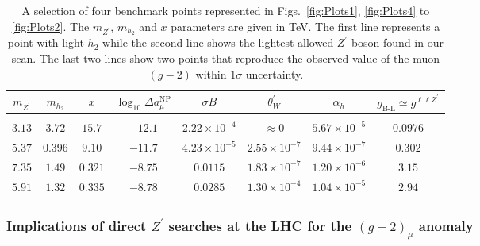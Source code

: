 \documentclass[10pt]{book}
\newcommand{\ro}[1]{\textrm{#1}}
\renewcommand{\(}{\left(}
\renewcommand{\)}{\right)}
\renewcommand{\[}{\left[}
\renewcommand{\]}{\right]}
\begin{document}
\begin{table}[H]
	\begin{center}
		\begin{tabular}{cccccccc}
			$m_{Z^\prime}$ & $m_{h_2}$ &  $x$ & $ \log_{10} \Delta a_\mu^{\ro{NP}}$ & $\sigma B$ & $\theta_W^\prime$ & $\alpha_h$ & $g_{\ro{B-L}} \simeq g^{\ell \ell Z^\prime}$ \vspace{1mm}
			\\
			\hline \vspace{-2mm} \\ 
			$3.13$ 			    							& $3.72$ 			    				& $15.7$		& $-12.1$	&	$2.22\times 10^{-4}$ &	$\approx 0$ &	$5.67 \times 10^{-5}$ &	$0.0976$\vspace{1mm} 	\\
			$5.37$ 			    							& $0.396$ 			    				& $9.10$		& $-11.7$	&	$4.23 \times 10^{-5}$ &	$2.55 \times 10^{-7}$ &	$9.44 \times 10^{-7}$ &	$0.302$\vspace{1mm}  	\\
			$7.35$ 			    							& $1.49$ 			    				& $0.321$		& $-8.75$	&	$0.0115$ &	$1.83 \times 10^{-7}$ &	$1.20 \times 10^{-6}$ &	$3.15$\vspace{1mm}  	\\
			$5.91$ 			    							& $1.32$ 			    				& $0.335$		& $-8.78$	&	$0.0285$ &	$1.30 \times 10^{-4}$ &	$1.04 \times 10^{-5} $ &	$2.94$\vspace{1mm}  	\\
		\end{tabular}
		\caption{A selection of four benchmark points represented in Figs.~\ref{fig:Plots1}, \ref{fig:Plots4} to \ref{fig:Plots2}. The $m_{Z^\prime}$, $m_{h_2}$ and $x$ parameters are given in TeV. The first line represents a point with light $h_2$ while the second line shows the lightest allowed $Z^\prime$ boson found in our scan. The last two lines show two points that reproduce the observed value of the muon $(g-2)$ within $1\sigma$ uncertainty.}
		\label{tab:bench}
	\end{center}
\end{table}
% 
\subsubsection{Implications of direct $Z^\prime$ searches at the LHC for the $\left(g-2\right)_\mu$ anomaly}
\end{document}
